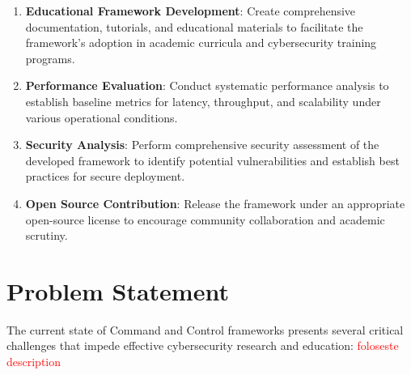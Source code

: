 \begin{enumerate}
\item \textbf{Educational Framework Development}: Create comprehensive documentation, tutorials, and educational materials to facilitate the framework's adoption in academic curricula and cybersecurity training programs.

\item \textbf{Performance Evaluation}: Conduct systematic performance analysis to establish baseline metrics for latency, throughput, and scalability under various operational conditions.

\item \textbf{Security Analysis}: Perform comprehensive security assessment of the developed framework to identify potential vulnerabilities and establish best practices for secure deployment.

\item \textbf{Open Source Contribution}: Release the framework under an appropriate open-source license to encourage community collaboration and academic scrutiny.
\end{enumerate}

\section{Problem Statement}
\label{sec:problem_statement}

The current state of Command and Control frameworks presents several critical challenges that impede effective cybersecurity research and education: \textcolor{red}{foloseste description}

